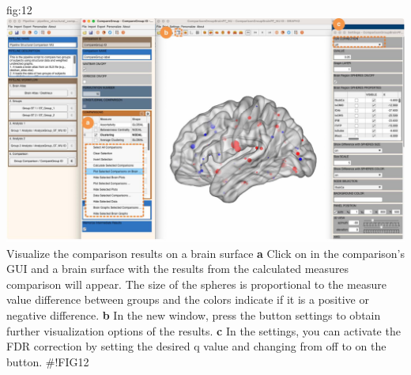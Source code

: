 \documentclass[justified]{tufte-handout}
\begin{document}
{fig:12}
{\includegraphics{fig12.jpg}
}
{Visualize the comparison results on a brain surface}
{
 	{\bf a} Click on  in the comparison's GUI and a brain surface with the results from the calculated measures comparison will appear. The size of the spheres is proportional to the measure value difference between groups and the colors indicate if it is a positive or negative difference.   
    {\bf b} In the new window, press the button settings to obtain further visualization options of the results. 
    {\bf c} In the settings, you can activate the FDR correction by setting the desired q value and changing from off to on the button.
}
#!FIG12
\end{document}
